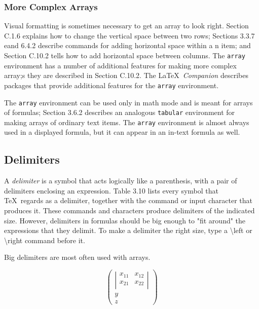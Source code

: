 \documentclass[twocolumn]{book}        %
\begin{document}
\subsubsection{More Complex Arrays}

Visual formatting is sometimes necessary to get an array to look right. Section C.1.6 explains 
how to change the vertical space between two rows; Sections 3.3.7 eand 6.4.2 describe commands for 
adding horizontal space within a n item; and Section C.10.2 tells how to add horizontal space 
between columns. The \texttt{array} environment has a number of additional features for making more 
complex array;s they are described in Section C.10.2. The \LaTeX\ \emph{Companion} describes packages 
that provide additional features for the \texttt{array} environment.

The \texttt{array} environment can be used only in math mode and is meant for arrays of formulas; 
Section 3.6.2 describes an analogous \texttt{tabular} environment for making arrays of ordinary text items. 
The \texttt{array} environment is almost always used in a displayed formula, but it can appear in an in-text 
formula as well.

\subsection{Delimiters}

A \emph{delimiter} is a symbol that acts logically like a parenthesis, with a pair of delimiters enclosing an 
expression. Table 3.10 lists every symbol that \TeX\ regards as a delimiter, together with the command or input 
character that produces it. These commands and characters produce delimiters of the indicated size. However,
delimiters in formulas should be big enough to "fit around" the expressions that they delimit. To make a 
delimiter the right size, type a \textbackslash left or \textbackslash right command before it.

Big delimiters are most often used with arrays.

\[ \left( \begin{array}{c}
    \left| \begin{array}{cc}
        x_{11} & x_{12} \\
        x_{21} & x_{22} \\
    \end{array}
    \right| \\
    y \\ z
\end{array} \right) \]
\end{document}
